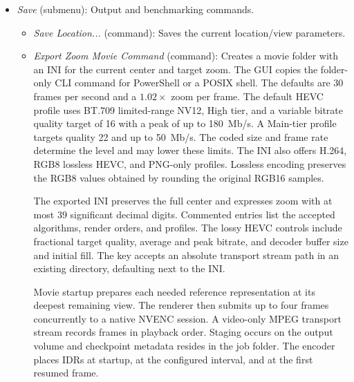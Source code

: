 \begin{itemize}
  \item \emph{Save} (submenu): Output and benchmarking commands.
    \begin{itemize}
      \item \emph{Save Location...} (command): Saves the current location/view parameters.
      \item \emph{Export Zoom Movie Command} (command): Creates a movie folder
      with an INI for the current center and target zoom. The GUI copies the
      folder-only CLI command for PowerShell or a POSIX shell. The defaults
      are 30 frames per second and a $1.02\times$ zoom per frame. The default
      HEVC profile uses BT.709 limited-range NV12, High tier, and a variable
      bitrate quality target of 16 with a peak of up to 180~Mb/s. A Main-tier
      profile targets quality 22 and up to 50~Mb/s. The coded size and frame
      rate determine the level and may lower these limits. The INI also offers
      H.264, RGB8 lossless HEVC, and PNG-only profiles. Lossless
      encoding preserves the RGB8 values obtained by rounding the original
      RGB16 samples.

      The exported INI preserves the full center and expresses zoom with at
      most 39 significant decimal digits. Commented entries list the accepted
      algorithms, render orders, and profiles. The lossy HEVC controls include
      fractional target quality, average and peak bitrate, and decoder buffer
      size and initial fill. The  key accepts an absolute
      transport stream path in an existing directory, defaulting next to the INI.

      Movie startup prepares each needed reference representation at its
      deepest remaining view. The renderer then submits up to four frames
      concurrently to a native NVENC session. A video-only MPEG transport
      stream records frames in playback order. Staging occurs on the output
      volume and checkpoint metadata resides in the job folder. The encoder places IDRs at
      startup, at the configured interval, and at the first resumed frame.


\end{itemize}
\end{itemize}

